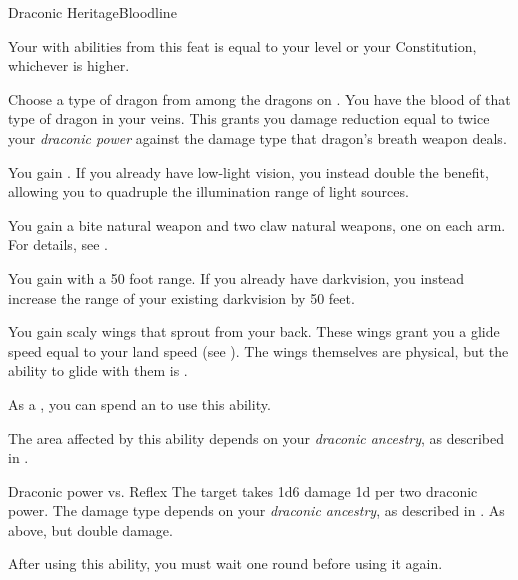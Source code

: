     \begin{feat}{Draconic Heritage}{Bloodline}
        \featben

         Your  with abilities from this feat is equal to your level or your Constitution, whichever is higher.

         Choose a type of dragon from among the dragons on .
        You have the blood of that type of dragon in your veins.
        This grants you damage reduction equal to twice your \textit{draconic power} against the damage type that dragon's breath weapon deals.

         You gain .
        If you already have low-light vision, you instead double the benefit, allowing you to quadruple the illumination range of light sources.

         You gain a bite natural weapon and two claw natural weapons, one on each arm.
        For details, see .

         You gain  with a 50 foot range.
        If you already have darkvision, you instead increase the range of your existing darkvision by 50 feet.

         You gain scaly wings that sprout from your back.
        These wings grant you a glide speed equal to your land speed (see ).
        The wings themselves are physical, but the ability to glide with them is .

         As a , you can spend an  to use this ability.
        \begin{ability}
            \begin{spelltargetinginfo}
                \spellspecial The area affected by this ability depends on your \textit{draconic ancestry}, as described in .
            \end{spelltargetinginfo}
            \begin{spelleffects}
                \begin{spellattack}{Draconic power vs. Reflex}
                    \spellsuccess The target takes 1d6 damage \plus1d per two draconic power.
                    The damage type depends on your \textit{draconic ancestry}, as described in .
                    \spellcritical As above, but double damage.
                \end{spellattack}
                \spellspecial After using this ability, you must wait one round before using it again.
            \end{spelleffects}
        \end{ability}


\end{feat}
